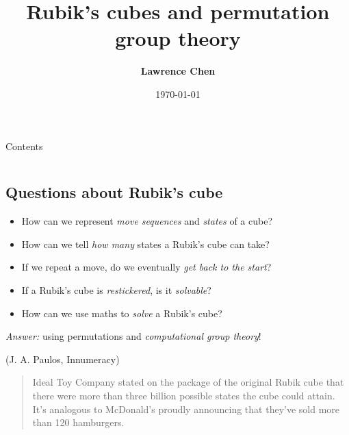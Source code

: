 \documentclass{beamer}
\title{\textbf{Rubik's cubes and permutation group theory}}
\author{\textbf{Lawrence Chen}}
\institute{\textbf{Honours presentation}}
\date{\today}
\begin{document}
\begin{frame}
    \titlepage
\end{frame}

\begin{frame}{Contents}
    \begin{columns}[t]
        \begin{column}{.5\textwidth}
            \tableofcontents[sections={1-2}]
        \end{column}
        \begin{column}{.5\textwidth}
            \tableofcontents[sections={3-4}]
        \end{column}
    \end{columns}
\end{frame}

\subsection{Questions about Rubik's cube}

\begin{slide}
    \begin{itemize}
        \item How can we represent \textit{move sequences} and \textit{states} of a cube? \pause
        \item How can we tell \textit{how many} states a Rubik's cube can take? \pause
        \item If we repeat a move, do we eventually \textit{get back to the start}? \pause
        \item If a Rubik's cube is \textit{restickered}, is it \textit{solvable}? \pause
        \item How can we use maths to \textit{solve} a Rubik's cube? \pause
    \end{itemize}

    \textit{Answer:} using permutations and \textit{computational group theory}! \pause

    \begin{alertblock}{(J. A. Paulos, Innumeracy)}
        \vspace{4pt}
        \begin{quotation}
            Ideal Toy Company stated on the package of the original Rubik cube that there were more than three billion possible states the cube could attain. It's analogous to McDonald's proudly announcing that they've sold more than 120 hamburgers.
        \end{quotation}
    \end{alertblock}
\end{slide}
\end{document}
